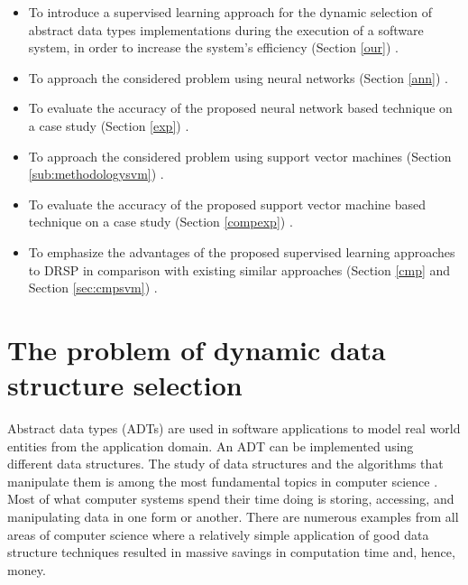 \begin{itemize}

\item To introduce a supervised learning approach for the dynamic selection of abstract data types implementations during the execution of a software system, in order to increase the system's efficiency (Section \ref{our}) \cite{Czibula11Intelligent, Czibula12SVM} . 

\item To approach the considered problem using neural networks (Section \ref{ann}) \cite{Czibula11Intelligent}.

\item To evaluate the accuracy of the proposed neural network based technique on a case study (Section \ref{exp}) \cite{Czibula11Intelligent}.

\item To approach the considered problem using support vector machines (Section \ref{sub:methodologysvm}) \cite{Czibula12SVM}.

\item To evaluate the accuracy of the proposed support vector machine based technique on a case study (Section \ref{compexp})  \cite{Czibula12SVM}.

\item To emphasize the advantages of the proposed supervised learning approaches to DRSP in comparison with existing similar approaches (Section \ref{cmp} and Section \ref{sec:cmpsvm}) \cite{Czibula11Intelligent, Czibula12SVM} .


\end{itemize}





\section{The problem of dynamic data structure selection}
\label{mot}


Abstract data types (ADTs) \cite{adt} are used in software applications to model real world entities from the application domain. An ADT can be implemented using different data structures. The study of data structures and the algorithms that manipulate them is among the most fundamental topics in computer science \cite{mount}. Most of what
computer systems spend their time doing is storing, accessing, and manipulating data in one form or another. There are numerous examples from all areas
of computer science where a relatively simple application of good data structure techniques resulted in massive savings in computation time and, hence, money.

